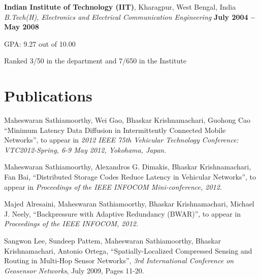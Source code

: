 \documentclass[margin,line]{resume}
\begin{document}
\begin{resume}
    
    \textbf{Indian Institute of Technology (IIT)}, Kharagpur, West Bengal, India \\%
    \textsl{B.Tech(H), Electronics and Electrical Communication Engineering} \hfill \textbf{ July 2004 -- May 2008}\vspace{-3mm}\\\vspace{-1mm}%
    \begin{list2}
    		\item GPA:	9.27 out of 10.00
    		\item Ranked 3/50 in the department and 7/650 in the Institute        
    \end{list2}\vspace{-1.5mm}%


\section{\mysidestyle Publications}
\begin{list2}
    \item Maheswaran Sathiamoorthy, Wei Gao, Bhaskar Krishnamachari, Guohong Cao
    ``Minimum Latency Data Diffusion in Intermittently Connected Mobile Networks'', 
    to appear in \textsl{2012 IEEE 75th Vehicular Technology Conference: VTC2012-Spring, 6-9 May 2012, Yokohama, Japan.}
    \item Maheswaran Sathiamoorthy, Alexandros G. Dimakis, Bhaskar Krishnamachari, Fan Bai, 
    ``Distributed Storage Codes Reduce Latency in Vehicular Networks'', 
    to appear in \textsl{Proceedings of the IEEE INFOCOM Mini-conference, 2012.}
    \item Majed Alresaini, Maheswaran Sathiamoorthy, Bhaskar Krishnamachari, Michael J. Neely, ``Backpressure with Adaptive Redundancy (BWAR)'', 
    to appear in \textsl{Proceedings of the IEEE INFOCOM, 2012.}
    \item Sangwon Lee, Sundeep Pattem, Maheswaran Sathiamoorthy, Bhaskar Krishnamachari, Antonio Ortega, ``Spatially-Localized Compressed Sensing and Routing in Multi-Hop Sensor Networks'', \textsl{3rd International Conference on Geosensor Networks}, July 2009, Pages 11-20.  
    \end{list2}



\end{resume}
\end{document}
